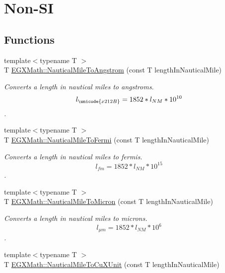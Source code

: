 \hypertarget{group___e_g_x_math-_conversions-_length_conversions-_nautical-_nautical_mile-_non-_s_i}{}\section{Non-\/\+SI}
\label{group___e_g_x_math-_conversions-_length_conversions-_nautical-_nautical_mile-_non-_s_i}
\subsection*{Functions}
\begin{DoxyCompactItemize}
\item 
{\footnotesize template$<$typename T $>$ }\\T \mbox{\hyperlink{group___e_g_x_math-_conversions-_length_conversions-_nautical-_nautical_mile-_non-_s_i_ga6f451e4456d985c7d63b39a084b3dd23}{E\+G\+X\+Math\+::\+Nautical\+Mile\+To\+Angstrom}} (const T length\+In\+Nautical\+Mile)
\begin{DoxyCompactList}\small\item\em Converts a length in nautical miles to angstroms. \[ l_{\unicode{x212B}}=1852 * l_{NM} * 10^{10} \]. \end{DoxyCompactList}\item 
{\footnotesize template$<$typename T $>$ }\\T \mbox{\hyperlink{group___e_g_x_math-_conversions-_length_conversions-_nautical-_nautical_mile-_non-_s_i_gaa4b84422943c37e49e5c3abdc7f301e4}{E\+G\+X\+Math\+::\+Nautical\+Mile\+To\+Fermi}} (const T length\+In\+Nautical\+Mile)
\begin{DoxyCompactList}\small\item\em Converts a length in nautical miles to fermis. \[ l_{fm}=1852 * l_{NM} * 10^{15} \]. \end{DoxyCompactList}\item 
{\footnotesize template$<$typename T $>$ }\\T \mbox{\hyperlink{group___e_g_x_math-_conversions-_length_conversions-_nautical-_nautical_mile-_non-_s_i_gad80a4f8f82660ad19a420e55bfb33447}{E\+G\+X\+Math\+::\+Nautical\+Mile\+To\+Micron}} (const T length\+In\+Nautical\+Mile)
\begin{DoxyCompactList}\small\item\em Converts a length in nautical miles to microns. \[ l_{\mu m}=1852 * l_{NM} * 10^{6} \]. \end{DoxyCompactList}\item 
{\footnotesize template$<$typename T $>$ }\\T \mbox{\hyperlink{group___e_g_x_math-_conversions-_length_conversions-_nautical-_nautical_mile-_non-_s_i_gaa0638917756d520cfc0877dcde60d777}{E\+G\+X\+Math\+::\+Nautical\+Mile\+To\+Cu\+X\+Unit}} (const T length\+In\+Nautical\+Mile)

\end{DoxyCompactItemize}
